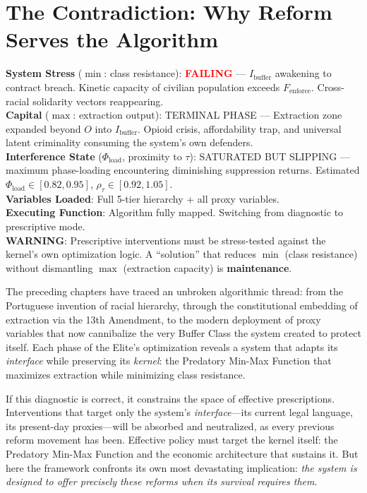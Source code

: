 \chapter{The Contradiction: Why Reform Serves the Algorithm}
\label{ch:contradiction}

\begin{tcolorbox}[colback=black!5, colframe=black!70, fonttitle=\bfseries\ttfamily, title=RUNTIME LOG: TESTING PRESCRIPTIVE INTERVENTIONS AGAINST KERNEL LOGIC]
\ttfamily\small
\textbf{System Stress} ($\min$: class resistance): \textcolor{red}{\textbf{FAILING}} --- $I_{\text{buffer}}$ awakening to contract breach. Kinetic capacity of civilian population exceeds $F_{\text{enforce}}$. Cross-racial solidarity vectors reappearing.\\
\textbf{Capital} ($\max$: extraction output): TERMINAL PHASE --- Extraction zone expanded beyond $O$ into $I_{\text{buffer}}$. Opioid crisis{,} affordability trap{,} and universal latent criminality consuming the system's own defenders.\\
\textbf{Interference State} ($\Phi_{\text{load}}$, proximity to $\tau$): SATURATED BUT SLIPPING --- maximum phase-loading encountering diminishing suppression returns. Estimated $\Phi_{\text{load}} \in [0.82, 0.95]$, $\rho_{\tau} \in [0.92, 1.05]$.\\
\textbf{Variables Loaded}: Full 5-tier hierarchy + all proxy variables.\\
\textbf{Executing Function}: Algorithm fully mapped. Switching from diagnostic to prescriptive mode.\\
\textbf{WARNING}: Prescriptive interventions must be stress-tested against the kernel's own optimization logic. A ``solution'' that reduces $\min$ (class resistance) without dismantling $\max$ (extraction capacity) is \textbf{maintenance}.
\end{tcolorbox}

\medskip

The preceding chapters have traced an unbroken algorithmic thread: from the Portuguese invention of racial hierarchy, through the constitutional embedding of extraction via the 13th Amendment, to the modern deployment of proxy variables that now cannibalize the very Buffer Class the system created to protect itself. Each phase of the Elite's optimization reveals a system that adapts its \textit{interface} while preserving its \textit{kernel}: the Predatory Min-Max Function that maximizes extraction while minimizing class resistance.

If this diagnostic is correct, it constrains the space of effective prescriptions. Interventions that target only the system's \textit{interface}---its current legal language, its present-day proxies---will be absorbed and neutralized, as every previous reform movement has been. Effective policy must target the kernel itself: the Predatory Min-Max Function and the economic architecture that sustains it. But here the framework confronts its own most devastating implication: \textit{the system is designed to offer precisely these reforms when its survival requires them}.

